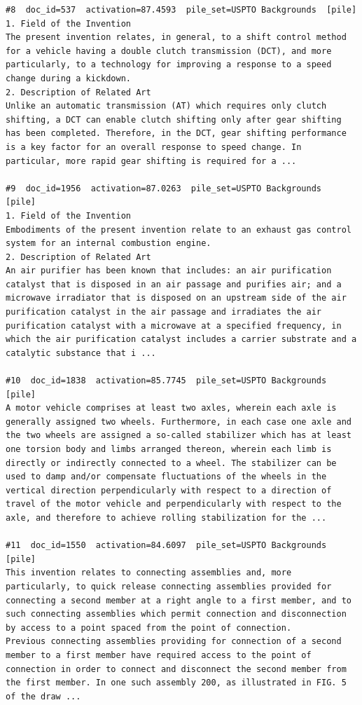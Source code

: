 \begin{verbatim}
#8  doc_id=537  activation=87.4593  pile_set=USPTO Backgrounds  [pile]
1. Field of the Invention
The present invention relates, in general, to a shift control method for a vehicle having a double clutch transmission (DCT), and more particularly, to a technology for improving a response to a speed change during a kickdown.
2. Description of Related Art
Unlike an automatic transmission (AT) which requires only clutch shifting, a DCT can enable clutch shifting only after gear shifting has been completed. Therefore, in the DCT, gear shifting performance is a key factor for an overall response to speed change. In particular, more rapid gear shifting is required for a ...

#9  doc_id=1956  activation=87.0263  pile_set=USPTO Backgrounds  [pile]
1. Field of the Invention
Embodiments of the present invention relate to an exhaust gas control system for an internal combustion engine.
2. Description of Related Art
An air purifier has been known that includes: an air purification catalyst that is disposed in an air passage and purifies air; and a microwave irradiator that is disposed on an upstream side of the air purification catalyst in the air passage and irradiates the air purification catalyst with a microwave at a specified frequency, in which the air purification catalyst includes a carrier substrate and a catalytic substance that i ...

#10  doc_id=1838  activation=85.7745  pile_set=USPTO Backgrounds  [pile]
A motor vehicle comprises at least two axles, wherein each axle is generally assigned two wheels. Furthermore, in each case one axle and the two wheels are assigned a so-called stabilizer which has at least one torsion body and limbs arranged thereon, wherein each limb is directly or indirectly connected to a wheel. The stabilizer can be used to damp and/or compensate fluctuations of the wheels in the vertical direction perpendicularly with respect to a direction of travel of the motor vehicle and perpendicularly with respect to the axle, and therefore to achieve rolling stabilization for the ...

#11  doc_id=1550  activation=84.6097  pile_set=USPTO Backgrounds  [pile]
This invention relates to connecting assemblies and, more particularly, to quick release connecting assemblies provided for connecting a second member at a right angle to a first member, and to such connecting assemblies which permit connection and disconnection by access to a point spaced from the point of connection.
Previous connecting assemblies providing for connection of a second member to a first member have required access to the point of connection in order to connect and disconnect the second member from the first member. In one such assembly 200, as illustrated in FIG. 5 of the draw ...


\end{verbatim}
